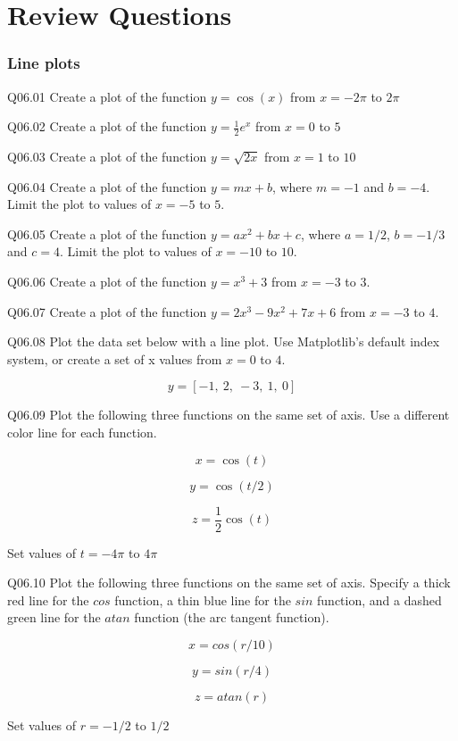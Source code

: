 \documentclass{book}
\newenvironment{problems}{}{}  %
\begin{document}
    
        \hypertarget{review-questions}{%
\section{Review Questions}\label{review-questions}}
    




    
        \hypertarget{line-plots}{%
\subsubsection{Line plots}\label{line-plots}}
    




    
        \begin{problems}
        Q06.01 Create a plot of the function \(y=\cos(x)\) from \(x = -2\pi\) to
\(2\pi\)

Q06.02 Create a plot of the function \(y=\frac{1}{2}{e^x}\) from
\(x = 0\) to \(5\)

Q06.03 Create a plot of the function \(y=\sqrt{2x}\) from \(x = 1\) to
\(10\)

Q06.04 Create a plot of the function \(y=mx+b\), where \(m=-1\) and
\(b=-4\). Limit the plot to values of \(x=-5\) to \(5\).

Q06.05 Create a plot of the function \(y=ax^2+bx+c\), where \(a=1/2\),
\(b=-1/3\) and \(c=4\). Limit the plot to values of \(x=-10\) to \(10\).

Q06.06 Create a plot of the function \(y=x^3+3\) from \(x=-3\) to \(3\).

Q06.07 Create a plot of the function \(y=2x^3-9x^2+7x+6\) from \(x=-3\)
to \(4\).

Q06.08 Plot the data set below with a line plot. Use Matplotlib's
default index system, or create a set of x values from \(x=0\) to \(4\).

\[ y = [-1,\ 2,\ -3,\ 1,\ 0] \]

Q06.09 Plot the following three functions on the same set of axis. Use a
different color line for each function.

\[ x = \cos(t) \]

\[ y = \cos(t/2) \]

\[ z = \frac{1}{2}\cos(t) \]

Set values of \(t=-4\pi\) to \(4\pi\)

Q06.10 Plot the following three functions on the same set of axis.
Specify a thick red line for the \(cos\) function, a thin blue line for
the \(sin\) function, and a dashed green line for the \(atan\) function
(the arc tangent function).

\[ x = cos(r/10) \]

\[ y = sin(r/4) \]

\[ z = atan(r) \]

Set values of \(r=-1/2\) to \(1/2\)
        \end{problems}
\end{document}
